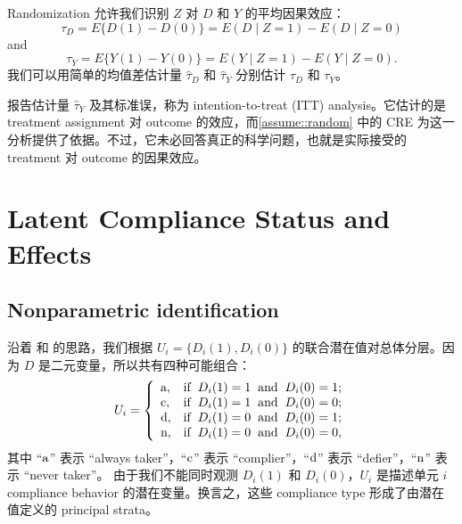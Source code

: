 Randomization 允许我们识别 $Z$ 对 $D$ 和 $Y$ 的平均因果效应：
$$
\tau_D = E\{  D(1) - D(0) \} = E(D\mid Z=1) - E(D \mid Z=0)
$$
and
$$
\tau_Y = E\{  Y(1) - Y(0) \} = E(Y\mid Z=1) - E(Y\mid Z=0).  
$$
我们可以用简单的均值差估计量 $\hat{\tau}_D$ 和 $\hat{\tau}_Y$ 分别估计 $\tau_D$ 和 $\tau_Y$。


报告估计量 $\hat{\tau}_Y$ 及其标准误，称为 intention-to-treat (ITT) analysis。它估计的是 treatment assignment 对 outcome 的效应，而\cref{assume::random} 中的 CRE 为这一分析提供了依据。不过，它未必回答真正的科学问题，也就是实际接受的 treatment 对 outcome 的因果效应。




\section{Latent Compliance Status and Effects}

\subsection{Nonparametric identification}


沿着 \citet{imbens1994identification} 和 \citet{angrist1996identification} 的思路，我们根据 $U_i = \{  D_i(1), D_i(0) \}$ 的联合潜在值对总体分层。因为 $D$ 是二元变量，所以共有四种可能组合：
\begin{eqnarray*}
U_i=\left \{ \begin{array} {ll}
\textup{a}  , & \text{if} \hspace{2mm} D_i(1)=1 \hspace{2mm} \text{and} \hspace{2mm} D_i(0)=1; \\
\textup{c}  , & \text{if} \hspace{2mm} D_i(1)=1 \hspace{2mm} \text{and} \hspace{2mm} D_i(0)=0; \\
\textup{d}  ,& \text{if} \hspace{2mm} D_i(1)=0 \hspace{2mm} \text{and} \hspace{2mm} D_i(0)=1; \\
\textup{n}  , & \text{if} \hspace{2mm} D_i(1)=0 \hspace{2mm} \text{and} \hspace{2mm} D_i(0)=0,
\end{array}
\right.  
\end{eqnarray*}
其中 ``$\textup{a}$'' 表示 ``always taker''，``$\textup{c}$'' 表示 ``complier''，``$\textup{d}$'' 表示 ``defier''，``$\textup{n}$'' 表示 ``never taker''。
由于我们不能同时观测 $D_i(1)$ 和 $D_i(0)$，$U_i$ 是描述单元 $i$ compliance behavior 的潜在变量。换言之，这些 compliance type 形成了由潜在值定义的 principal strata。


